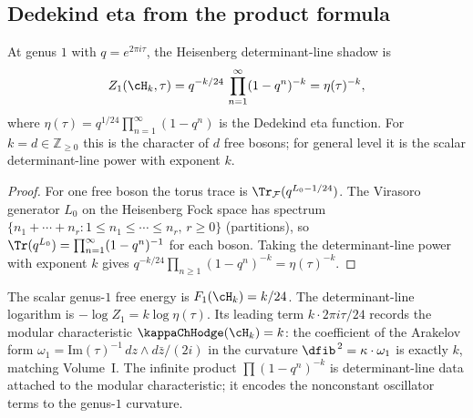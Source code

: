 \subsection{Dedekind eta from the product formula}

\begin{corollary}
At genus $1$ with $q = e^{2\pi i\tau}$, the Heisenberg
determinant-line shadow is
\begin{equation}
Z_1(\cH_k, \tau)
= q^{-k/24}\, \prod_{n=1}^\infty (1 - q^n)^{-k}
= \eta(\tau)^{-k},
\end{equation}
where $\eta(\tau) = q^{1/24} \prod_{n=1}^\infty (1 - q^n)$ is the
Dedekind eta function. For $k=d\in\mathbb{Z}_{\geq 0}$ this is the
character of $d$ free bosons; for general level it is the scalar
determinant-line power with exponent $k$.
\end{corollary}

\begin{proof}
For one free boson the torus trace is
$\Tr_{\mathcal{F}}(q^{L_0 - 1/24})$. The Virasoro generator
$L_0$ on the Heisenberg Fock space has spectrum
$\{n_1 + \cdots + n_r : 1 \le n_1 \le \cdots \le n_r,\,
r \ge 0\}$ (partitions), so
$\Tr(q^{L_0}) = \prod_{n=1}^\infty (1-q^n)^{-1}$ for each
boson. Taking the determinant-line power with exponent $k$ gives
$q^{-k/24}\prod_{n\geq 1}(1-q^n)^{-k}=\eta(\tau)^{-k}$.
\end{proof}

\begin{remark}
The scalar genus-$1$ free energy is $F_1(\cH_k)=k/24$. The
determinant-line logarithm is
$-\log Z_1=k\log\eta(\tau)$. Its leading term
$k\cdot 2\pi i\tau/24$ records the modular characteristic
$\kappaChHodge(\cH_k) = k$: the coefficient of the Arakelov form
$\omega_1 = \mathrm{Im}(\tau)^{-1}\, dz \wedge d\bar{z}/(2i)$
in the curvature $\dfib^{\,2} = \kappa \cdot \omega_1$ is
exactly $k$, matching Volume~I. The infinite product
$\prod(1-q^n)^{-k}$ is determinant-line data attached to
the modular characteristic; it encodes the nonconstant oscillator terms
to the genus-$1$ curvature.
\end{remark}


